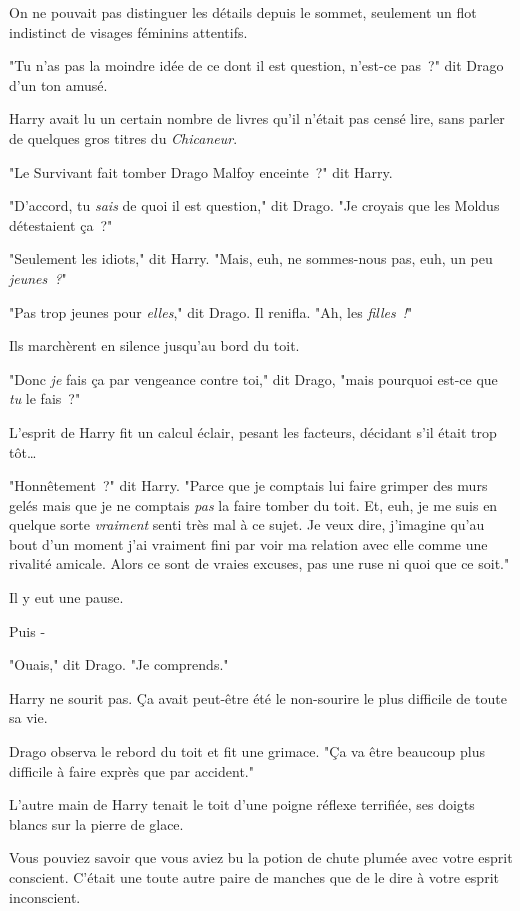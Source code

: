 \later

On ne pouvait pas distinguer les détails depuis le sommet, seulement un flot indistinct de visages féminins attentifs.

"Tu n'as pas la moindre idée de ce dont il est question, n'est-ce pas~?" dit Drago d'un ton amusé.

Harry avait lu un certain nombre de livres qu'il n'était pas censé lire, sans parler de quelques gros titres du \emph{Chicaneur}.

"Le Survivant fait tomber Drago Malfoy enceinte~?" dit Harry.

"D'accord, tu \emph{sais} de quoi il est question," dit Drago. "Je croyais que les Moldus détestaient ça~?"

"Seulement les idiots," dit Harry. "Mais, euh, ne sommes-nous pas, euh, un peu \emph{jeunes~?}"

"Pas trop jeunes pour \emph{elles}," dit Drago. Il renifla. "Ah, les \emph{filles~!}"

Ils marchèrent en silence jusqu'au bord du toit.

"Donc \emph{je} fais ça par vengeance contre toi," dit Drago, "mais pourquoi est-ce que \emph{tu} le fais~?"

L'esprit de Harry fit un calcul éclair, pesant les facteurs, décidant s'il était trop tôt…

"Honnêtement~?" dit Harry. "Parce que je comptais lui faire grimper des murs gelés mais que je ne comptais \emph{pas} la faire tomber du toit. Et, euh, je me suis en quelque sorte \emph{vraiment} senti très mal à ce sujet. Je veux dire, j'imagine qu'au bout d'un moment j'ai vraiment fini par voir ma relation avec elle comme une rivalité amicale. Alors ce sont de vraies excuses, pas une ruse ni quoi que ce soit."

Il y eut une pause.

Puis -

"Ouais," dit Drago. "Je comprends."

Harry ne sourit pas. Ça avait peut-être été le non-sourire le plus difficile de toute sa vie.

Drago observa le rebord du toit et fit une grimace. "Ça va être beaucoup plus difficile à faire exprès que par accident."

\later

L'autre main de Harry tenait le toit d'une poigne réflexe terrifiée, ses doigts blancs sur la pierre de glace.

Vous pouviez savoir que vous aviez bu la potion de chute plumée avec votre esprit conscient. C'était une toute autre paire de manches que de le dire à votre esprit inconscient.

